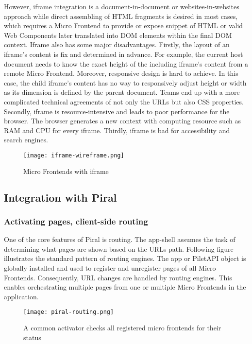 \documentclass[a4paper]{book}
\begin{document}
However, iframe integration is a document-in-document or websites-in-websites approach while direct assembling of HTML fragments is desired in most cases, which requires a Micro Frontend to provide or expose snippet of HTML or valid Web Components later translated into DOM elements within the final DOM context. Iframe also has some major        disadvantages. Firstly, the layout of an iframe’s content is fix and determined in advance. For example, the current host document needs to know the exact height of the including iframe’s content from a remote Micro Frontend. Moreover, responsive design is hard to achieve. In this case, the child iframe’s content has no way to responsively adjust height or width as its dimension is defined by the parent document. Teams end up with a more complicated technical agreements of not only the URLs but also CSS properties. Secondly, iframe is resource-intensive and leads to poor performance for the browser. The browser generates a new context with computing resource such as RAM and CPU for every iframe. Thirdly, iframe is bad for accessibility and search engines.

\begin{figure}[h!]
  \centering
  \captionsetup{justification=centering}
  \texttt{[image: iframe-wireframe.png]}
  \caption{Micro Frontends with iframe \cite{Luc21}}
  \label{fig:iframe}
\end{figure}

\subsection{Integration with Piral} \label{Integration with Pira}

\subsubsection{Activating pages, client-side routing}
One of the core features of Piral is routing. The app-shell assumes the task of determining what pages are shown based on the URLs path. Following figure illustrates the standard pattern of routing engines. The app or PiletAPI object is globally installed and used to register and unregister pages of all Micro Frontends. Consequently, URL changes are handled by routing engines. This enables orchestrating multiple pages from one or multiple Micro Frontends in the application.
\begin{figure}[h!]
  \centering
  \captionsetup{justification=centering}
  \texttt{[image: piral-routing.png]}
  \caption{A common activator checks all registered micro frontends for their status \cite{Rap20}}
  \label{fig:piral-routing}
\end{figure}
\end{document}
